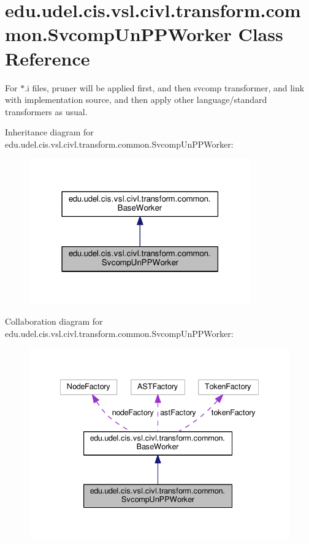 \hypertarget{classedu_1_1udel_1_1cis_1_1vsl_1_1civl_1_1transform_1_1common_1_1SvcompUnPPWorker}{}\section{edu.\+udel.\+cis.\+vsl.\+civl.\+transform.\+common.\+Svcomp\+Un\+P\+P\+Worker Class Reference}
\label{classedu_1_1udel_1_1cis_1_1vsl_1_1civl_1_1transform_1_1common_1_1SvcompUnPPWorker}


For $\ast$.i files, pruner will be applied first, and then svcomp transformer, and link with implementation source, and then apply other language/standard transformers as usual.  




Inheritance diagram for edu.\+udel.\+cis.\+vsl.\+civl.\+transform.\+common.\+Svcomp\+Un\+P\+P\+Worker\+:
\nopagebreak
\begin{figure}[H]
\begin{center}
\leavevmode
\includegraphics[width=271pt]{classedu_1_1udel_1_1cis_1_1vsl_1_1civl_1_1transform_1_1common_1_1SvcompUnPPWorker__inherit__graph}
\end{center}
\end{figure}


Collaboration diagram for edu.\+udel.\+cis.\+vsl.\+civl.\+transform.\+common.\+Svcomp\+Un\+P\+P\+Worker\+:
\nopagebreak
\begin{figure}[H]
\begin{center}
\leavevmode
\includegraphics[width=335pt]{classedu_1_1udel_1_1cis_1_1vsl_1_1civl_1_1transform_1_1common_1_1SvcompUnPPWorker__coll__graph}
\end{center}
\end{figure}
